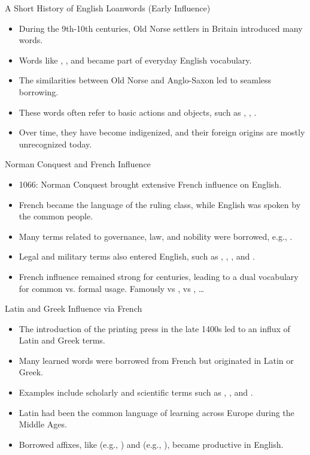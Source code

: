\documentclass{beamer}
\begin{document}
\begin{frame}{A Short History of English Loanwords (Early Influence)}
    \begin{itemize}
        \item During the 9th-10th centuries, Old Norse settlers in Britain introduced many words.
        \item Words like , , and  became part of everyday English vocabulary.
        \item The similarities between Old Norse and Anglo-Saxon led to seamless borrowing.
        \item These words often refer to basic actions and objects, such as , , .
        \item Over time, they have become indigenized, and their foreign origins are mostly unrecognized today.
    \end{itemize}
\end{frame}

\begin{frame}{Norman Conquest and French Influence}
    \begin{itemize}
        \item 1066: Norman Conquest brought extensive French influence on English.
        \item French became the language of the ruling class, while English was spoken by the common people.
        \item Many terms related to governance, law, and nobility were borrowed, e.g., .
        \item Legal and military terms also entered English, such as , , , and .
        \item French influence remained strong for centuries, leading to a dual vocabulary for common vs. formal usage.  Famously  vs ,  vs , \ldots
    \end{itemize}
\end{frame}

\begin{frame}{Latin and Greek Influence via French}
    \begin{itemize}
        \item The introduction of the printing press in the late 1400s led to an influx of Latin and Greek terms.
        \item Many learned words were borrowed from French but originated in Latin or Greek.
        \item Examples include scholarly and scientific terms such as , , and .
        \item Latin had been the common language of learning across Europe during the Middle Ages.
        \item Borrowed affixes, like  (e.g., ) and  (e.g., ), became productive in English.
    \end{itemize}
\end{frame}
\end{document}
